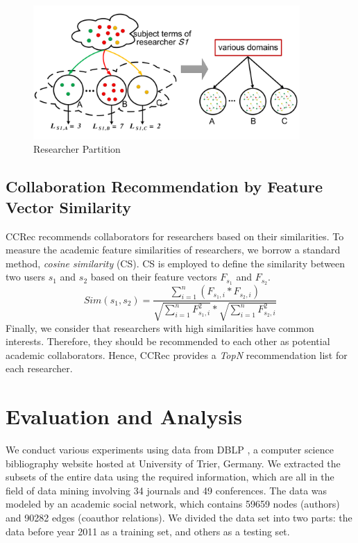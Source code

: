 \documentclass[review]{elsarticle}
\begin{document}
\begin{figure}
\centering
\includegraphics [width=4in]{Fig2.pdf}
\caption{Researcher Partition}
\end{figure}

\subsection{Collaboration Recommendation by Feature Vector Similarity}
CCRec recommends collaborators for researchers based on their similarities. To measure the academic feature similarities of researchers, we borrow a standard method, \emph{cosine similarity} (CS). CS is employed to define the similarity between two users $s_{1}$ and $s_{2}$ based on their feature vectors $F_{s_{1}}$ and $F_{s_{2}}$.
\begin{equation}
Sim(s_{1},s_{2})=\frac{\sum_{i=1}^{n}(F_{s_{1},i}*F_{s_{2},i})}{\sqrt{\sum_{i=1}^{n}F_{s_{1},i}^2}*\sqrt{\sum_{i=1}^{n}F_{s_{2},i}^2}}
\end{equation}
Finally, we consider that researchers with high similarities have common interests. Therefore, they should be recommended to each other as potential academic collaborators. Hence, CCRec provides a \emph{TopN} recommendation list for each researcher.

\section{Evaluation and Analysis}
We conduct various experiments using data from DBLP \cite{Ley:DBLP}, a computer science bibliography website hosted at University of Trier, Germany. We extracted the subsets of the entire data using the required information, which are all in the field of data mining involving 34 journals and 49 conferences. The data was modeled by an academic social network, which contains 59659 nodes (authors) and 90282 edges (coauthor relations). We divided the data set into two parts: the data before year 2011 as a training set, and others as a testing set.
\end{document}
